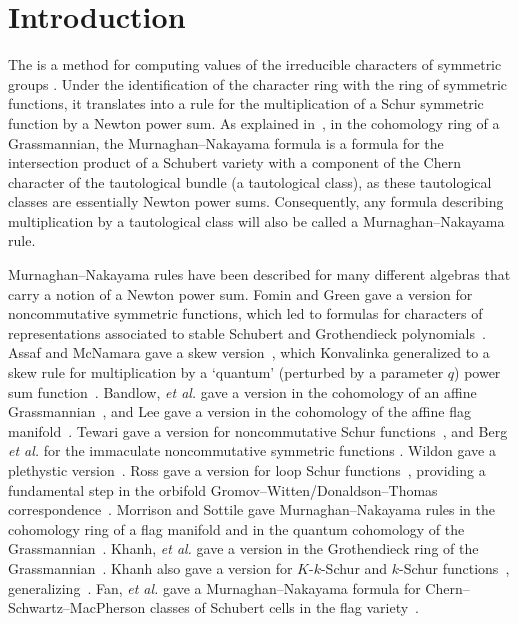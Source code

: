 \section{Introduction}

The  is a method for computing values of the
irreducible characters of symmetric groups \cite{Mu37,Na41a,Na41b}.
Under the identification of the character ring with the ring of symmetric
functions, it translates into a rule for the multiplication of a Schur
symmetric function by a Newton power sum.
As explained in~\cite[Sect.~2]{MorrisonSottile}, in the cohomology ring of a Grassmannian, the
Murnaghan--Nakayama formula is a formula for the intersection product of a Schubert variety
with a component of the Chern character of the tautological bundle (a tautological class), as these tautological classes are
essentially Newton power sums.
Consequently, any formula describing multiplication by a tautological class will also be called a Murnaghan--Nakayama rule.

Murnaghan--Nakayama rules have been described for many different algebras
that carry a notion of a Newton power sum.
        Fomin and Green gave a version for noncommutative symmetric functions, which
        led to formulas for characters of representations associated to stable Schubert
        and Grothendieck polynomials~\cite{FoGr98}.
        Assaf and McNamara gave a skew version~\cite{A-McN}, which Konvalinka generalized to a skew
        rule for multiplication by a `quantum' (perturbed by a parameter $q$) power sum
        function~\cite{Ko12}.
        Bandlow, \emph{et al.} gave a version in the cohomology of an affine Grassmannian~\cite{BSZ11},
        and Lee gave a version in the cohomology of the affine flag manifold~\cite{Lee}.
        Tewari gave a version for noncommutative Schur functions~\cite{Tewari},
        and Berg \emph{et al.} for the immaculate noncommutative symmetric functions \cite{BBSSZ}.
        Wildon gave a plethystic version~\cite{Wildon}.
        Ross gave a version for loop Schur functions~\cite{Ro14}, providing
        a fundamental step in the orbifold Gromov--Witten/Donaldson--Thomas
        correspondence~\cite{RoZo13}.
        Morrison and Sottile gave Murnaghan--Nakayama rules in
        the cohomology ring of a flag manifold and in the quantum cohomology of the
        Grassmannian~\cite{MorrisonSottile}.
        Khanh, \emph{et al.} gave a version in the Grothendieck ring of the Grassmannian~\cite{KHST}.
        Khanh also gave a version for $K$-$k$-Schur and $k$-Schur functions~\cite{Khanh}, generalizing~\cite{BSZ11}.
        Fan, \emph{et al.}  gave a Murnaghan--Nakayama formula for Chern--Schwartz--MacPherson classes of
        Schubert cells in the flag variety~\cite{FGX}.


